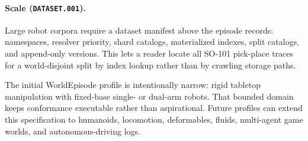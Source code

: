 \paragraph{Scale (\texttt{DATASET.001}).}
Large robot corpora require a dataset manifest above the episode records: namespaces, resolver
priority, shard catalogs, materialized indexes, split catalogs, and append-only versions. This lets
a reader locate all SO-101 pick-place traces for a world-disjoint split by index lookup rather than
by crawling storage paths.

The initial WorldEpisode profile is intentionally narrow: rigid tabletop manipulation with
fixed-base single- or dual-arm robots. That bounded domain keeps conformance executable rather than
aspirational. Future profiles can extend this specification to humanoids, locomotion, deformables,
fluids, multi-agent game worlds, and autonomous-driving logs.
